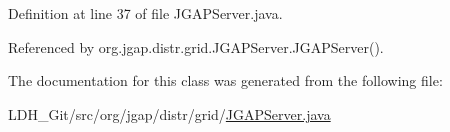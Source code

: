 Definition at line 37 of file J\-G\-A\-P\-Server.\-java.



Referenced by org.\-jgap.\-distr.\-grid.\-J\-G\-A\-P\-Server.\-J\-G\-A\-P\-Server().



The documentation for this class was generated from the following file\-:\begin{DoxyCompactItemize}
\item 
L\-D\-H\-\_\-\-Git/src/org/jgap/distr/grid/\hyperlink{_j_g_a_p_server_8java}{J\-G\-A\-P\-Server.\-java}\end{DoxyCompactItemize}
